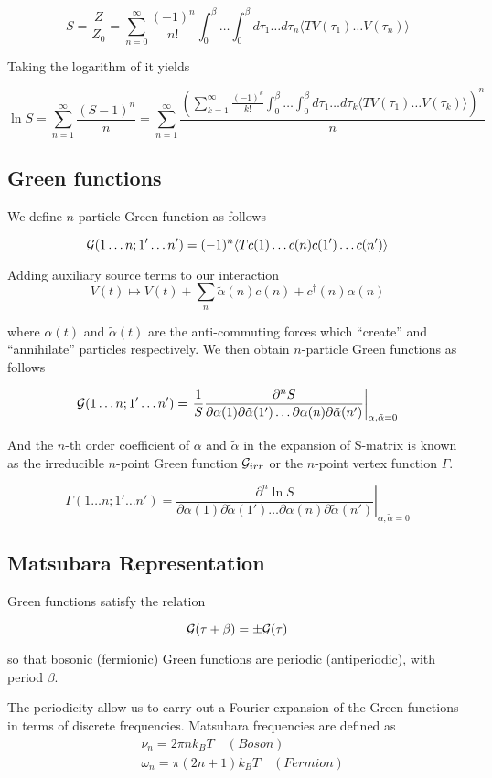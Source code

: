 \[ S = \frac{Z}{Z_0} = \sum_{n=0}^{\infty}\frac{(-1)^n}{n!}\int_{0}^{\beta}\dots\int_{0}^{\beta} d\tau_1\dots d\tau_n 
    \langle T V(\tau_1)\dots V(\tau_n) \rangle \]

Taking the logarithm of it yields

\[ \ln{S} = \sum_{n=1}^{\infty}\frac{(S-1)^n}{n} = \sum_{n=1}^{\infty}
  \frac{(\sum_{k=1}^{\infty}\frac{(-1)^k}{k!}\int_{0}^{\beta}\dots\int_{0}^{\beta} d\tau_1\dots d\tau_k 
    \langle T V(\tau_1)\dots V(\tau_k) \rangle)^n}{n} \]

\subsection{Green functions}
We define $n$-particle Green function as follows

\[ \mathcal{G}(1\dots n;1'\dots n') = (-1)^n\langle T c(1)\dots c(n)c(1')\dots c(n')\rangle \]

Adding auxiliary source terms to our interaction
\[ V(t) \mapsto V(t) + \sum_n \tilde{\alpha}(n)c(n)+c^\dagger(n) \alpha(n) \] 

where $\alpha(t)$ and $\tilde{\alpha}(t)$ are the anti-commuting forces which ``create'' and ``annihilate'' particles respectively.
We then obtain $n$-particle Green functions as follows

\[ \mathcal{G}(1\dots n;1'\dots n') = \left.\frac{1}{S}\frac{\partial^n S}{\partial\alpha(1)\partial\tilde{\alpha}(1')\dots \partial\alpha(n)\partial\tilde{\alpha}(n')}\right|_{\alpha,\tilde{\alpha}=0} \]

And the $n$-th order coefficient of $\alpha$ and $\tilde{\alpha}$ in the expansion of S-matrix
is known as the irreducible $n$-point Green function $\mathcal{G}_{irr}$ or the $n$-point vertex function $\Gamma$.

\[ \Gamma(1\dots n;1'\dots n') = \left.\frac{\partial^n \ln{S}}{\partial\alpha(1)\partial\tilde{\alpha}(1')\dots \partial\alpha(n)\partial\tilde{\alpha}(n')}\right|_{\alpha,\tilde{\alpha}=0} \]

\subsection{Matsubara Representation}
\label{sec:matsubara}
Green functions satisfy the relation

\[ \mathcal{G}(\tau+\beta) = \pm \mathcal{G}(\tau) \]

so that bosonic (fermionic) Green functions are periodic (antiperiodic), with period $\beta$.

The periodicity allow us to carry out a Fourier expansion of the Green functions in terms of discrete frequencies.
Matsubara frequencies are defined as
\begin{align*}
  & \nu_n = 2\pi n k_B T \quad (Boson) \\ 
  & \omega_n = \pi(2n+1)k_B T \quad (Fermion)
\end{align*}

